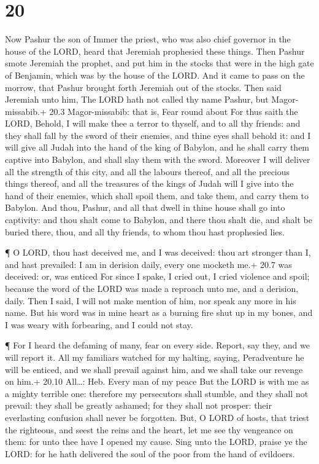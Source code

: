 \hypertarget{section-19}{%
\section{20}\label{section-19}}

 Now Pashur the son of Immer the priest, who was also chief
governor in the house of the LORD, heard that Jeremiah prophesied these
things.  Then Pashur smote Jeremiah the prophet, and put him
in the stocks that were in the high gate of Benjamin, which was by the
house of the LORD.  And it came to pass on the morrow, that
Pashur brought forth Jeremiah out of the stocks. Then said Jeremiah unto
him, The LORD hath not called thy name Pashur, but Magor-missabib.+ 20.3
Magor-missabib: that is, Fear round about  For thus saith
the LORD, Behold, I will make thee a terror to thyself, and to all thy
friends: and they shall fall by the sword of their enemies, and thine
eyes shall behold it: and I will give all Judah into the hand of the
king of Babylon, and he shall carry them captive into Babylon, and shall
slay them with the sword.  Moreover I will deliver all the
strength of this city, and all the labours thereof, and all the precious
things thereof, and all the treasures of the kings of Judah will I give
into the hand of their enemies, which shall spoil them, and take them,
and carry them to Babylon.  And thou, Pashur, and all that
dwell in thine house shall go into captivity: and thou shalt come to
Babylon, and there thou shalt die, and shalt be buried there, thou, and
all thy friends, to whom thou hast prophesied lies.

 ¶ O LORD, thou hast deceived me, and I was deceived: thou
art stronger than I, and hast prevailed: I am in derision daily, every
one mocketh me.+ 20.7 was deceived: or, was enticed  For
since I spake, I cried out, I cried violence and spoil; because the word
of the LORD was made a reproach unto me, and a derision, daily.
 Then I said, I will not make mention of him, nor speak any
more in his name. But his word was in mine heart as a burning fire shut
up in my bones, and I was weary with forbearing, and I could not stay.

 ¶ For I heard the defaming of many, fear on every side.
Report, say they, and we will report it. All my familiars watched for my
halting, saying, Peradventure he will be enticed, and we shall prevail
against him, and we shall take our revenge on him.+ 20.10 All\ldots:
Heb. Every man of my peace  But the LORD is with me as a
mighty terrible one: therefore my persecutors shall stumble, and they
shall not prevail: they shall be greatly ashamed; for they shall not
prosper: their everlasting confusion shall never be forgotten.
 But, O LORD of hosts, that triest the righteous, and seest
the reins and the heart, let me see thy vengeance on them: for unto thee
have I opened my cause.  Sing unto the LORD, praise ye the
LORD: for he hath delivered the soul of the poor from the hand of
evildoers.

